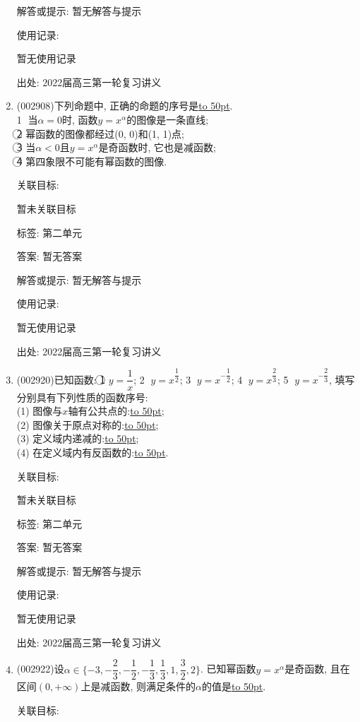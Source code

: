 \documentclass[10pt,a4paper]{article}
\newcommand{\blank}[1]{\underline{\hbox to #1pt{}}}
\begin{document}
\begin{enumerate}[1.]
解答或提示: 暂无解答与提示

使用记录:

暂无使用记录


出处: 2022届高三第一轮复习讲义
\item { (002908)}下列命题中, 正确的命题的序号是\blank{50}.\\
\textcircled{1} 当$\alpha =0$时, 函数$y={x^{\alpha }}$的图像是一条直线;\\
\textcircled{2} 幂函数的图像都经过(0, 0)和(1, 1)点;\\
\textcircled{3} 当$\alpha <0$且$y={x^{\alpha }}$是奇函数时, 它也是减函数;\\
\textcircled{4} 第四象限不可能有幂函数的图像.


关联目标:

暂未关联目标



标签: 第二单元

答案: 暂无答案

解答或提示: 暂无解答与提示

使用记录:

暂无使用记录


出处: 2022届高三第一轮复习讲义
\item { (002920)}已知函数: \textcircled{1} $y=\dfrac 1x$; \textcircled{2} $y=x^{\dfrac 12}$; \textcircled{3} $y=x^{-\dfrac 12}$; \textcircled{4} $y={x^{\dfrac 23}}$; \textcircled{5} $y=x^{-\dfrac 23}$, 填写分别具有下列性质的函数序号:\\ 
(1) 图像与$x$轴有公共点的:\blank{50};\\
(2) 图像关于原点对称的:\blank{50};\\
(3) 定义域内递减的:\blank{50};\\
(4) 在定义域内有反函数的:\blank{50}.


关联目标:

暂未关联目标



标签: 第二单元

答案: 暂无答案

解答或提示: 暂无解答与提示

使用记录:

暂无使用记录


出处: 2022届高三第一轮复习讲义
\item { (002922)}设$\alpha \in \{-3,-\dfrac 23,-\dfrac 12,-\dfrac 13,\dfrac 13,1,\dfrac 32,2\}$. 已知幂函数$y=x^{\alpha}$是奇函数, 且在区间$(0,+\infty)$上是减函数, 则满足条件的$\alpha$的值是\blank{50}.


关联目标:


\end{enumerate}
\end{document}
